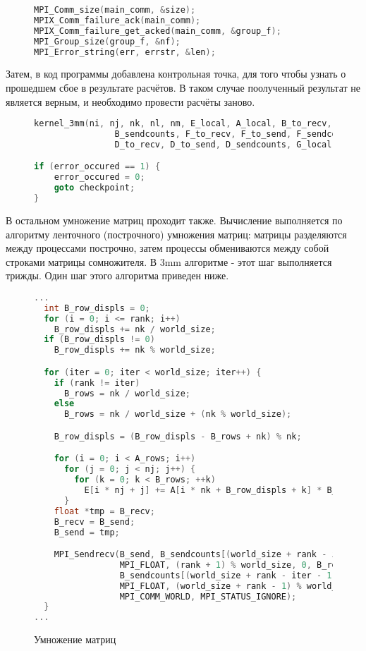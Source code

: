\documentclass[12pt, oneside, a4paper]{article}
\begin{document}
\begin{figure}[h]
\begin{lstlisting}[language=C++]
MPI_Comm_size(main_comm, &size);
MPIX_Comm_failure_ack(main_comm);
MPIX_Comm_failure_get_acked(main_comm, &group_f);
MPI_Group_size(group_f, &nf);
MPI_Error_string(err, errstr, &len);
\end{lstlisting}
\end{figure}

Затем, в код программы добавлена контрольная точка, для того чтобы узнать о прошедшем сбое в результате расчётов. В таком случае поолученный результат не является верным, и необходимо провести расчёты заново.

\begin{figure}[h]
\begin{lstlisting}[language=C++]
kernel_3mm(ni, nj, nk, nl, nm, E_local, A_local, B_to_recv, B_to_send,
                B_sendcounts, F_to_recv, F_to_send, F_sendcounts, C_local,
                D_to_recv, D_to_send, D_sendcounts, G_local);

if (error_occured == 1) {
	error_occured = 0;
	goto checkpoint;
}
\end{lstlisting}
\end{figure}



В остальном умножение матриц проходит также. Вычисление выполняется по алгоритму ленточного (построчного) умножения матриц: матрицы разделяются между процессами построчно, затем процессы обмениваются между собой строками матрицы сомножителя. В 3mm алгоритме - этот шаг выполняется трижды. Один шаг этого алгоритма приведен ниже.

\begin{figure}[h]
\begin{lstlisting}[language=C++]
...
  int B_row_displs = 0;
  for (i = 0; i <= rank; i++)
    B_row_displs += nk / world_size;
  if (B_row_displs != 0)
    B_row_displs += nk % world_size;

  for (iter = 0; iter < world_size; iter++) {
    if (rank != iter)
      B_rows = nk / world_size;
    else
      B_rows = nk / world_size + (nk % world_size);

    B_row_displs = (B_row_displs - B_rows + nk) % nk;

    for (i = 0; i < A_rows; i++)
      for (j = 0; j < nj; j++) {
        for (k = 0; k < B_rows; ++k)
          E[i * nj + j] += A[i * nk + B_row_displs + k] * B_recv[k * nj + j];
      }
    float *tmp = B_recv;
    B_recv = B_send;
    B_send = tmp;

    MPI_Sendrecv(B_send, B_sendcounts[(world_size + rank - iter) % world_size],
                 MPI_FLOAT, (rank + 1) % world_size, 0, B_recv,
                 B_sendcounts[(world_size + rank - iter - 1) % world_size],
                 MPI_FLOAT, (world_size + rank - 1) % world_size, 0,
                 MPI_COMM_WORLD, MPI_STATUS_IGNORE);
  }
...
\end{lstlisting}
\caption{Умножение матриц}
\end{figure}
\end{document}
